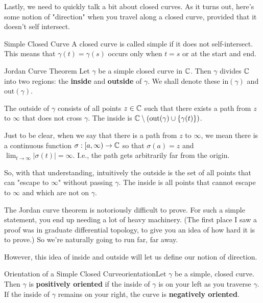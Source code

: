 Lastly, we need to quickly talk a bit about closed curves. As it turns out, here's some notion of "direction" when you travel along a closed curve, provided that it doesn't self intersect. 

\begin{defbo}{Simple Closed Curve}{}
A closed curve is called simple if it does not self-intersect. This means that $\gamma(t) = \gamma(s)$ occurs only when $t = s$ or at the start and end.
\end{defbo}

\begin{thmbo}{Jordan Curve Theorem}{} Let $\gamma$ be a simple closed curve in $\mathbb{C}$. Then $\gamma$ divides $\mathbb{C}$ into two regions: the {\bf inside} and {\bf outside} of $\gamma$. We shall denote these $\mathrm{in}(\gamma)$ and $\mathrm{out}(\gamma)$.

The outside of $\gamma$ consists of all points $z\in \mathbb{C}$ such that there exists a path from $z$ to $\infty$ that does not cross $\gamma$. The inside is $\mathbb{C}\setminus (\mathrm{out}(\gamma) \cup \{\gamma(t)\})$.
\end{thmbo}

Just to be clear, when we say that there is a path from $z$ to $\infty$, we mean there is a continuous function $\sigma:[a,\infty)\rightarrow \mathbb{C}$ so that $\sigma(a) = z$ and $\lim_{t\rightarrow \infty} |\sigma(t)| = \infty$. I.e., the path gets arbitrarily far from the origin.

So, with that understanding, intuitively the outside is the set of all points that can "escape to $\infty$" without passing $\gamma$. The inside is all points that cannot escape to $\infty$ and which are not on $\gamma$.

The Jordan curve theorem is notoriously difficult to prove. For such a simple statement, you end up needing a lot of heavy machinery. (The first place I saw a proof was in graduate differential topology, to give you an idea of how hard it is to prove.) So we're naturally going to run far, far away.

However, this idea of inside and outside will let us define our notion of direction.

\begin{defbo}{Orientation of a Simple Closed Curve}{orientation}Let $\gamma$ be a simple, closed curve. Then $\gamma$ is {\bf positively oriented} if the inside of $\gamma$ is on your left as you traverse $\gamma$. If the inside of $\gamma$ remains on your right, the curve is {\bf negatively oriented}.
\end{defbo}

